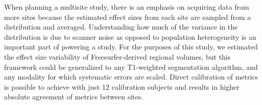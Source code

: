 When planning a multisite study, there is an emphasis on acquiring data from more sites because the estimated effect sizes from each site are sampled from a distribution and averaged. Understanding how much of the variance in the distribution is due to scanner noise as opposed to population heterogeneity is an important part of powering a study. For the purposes of this study, we estimated the effect size variability of Freesurfer-derived regional volumes, but this framework could be generalized to any T1-weighted segmentation algorithm, and any modality for which systematic errors are scaled. Direct calibration of metrics is possible to achieve with just 12 calibration subjects and results in higher absolute agreement of metrics between sites.